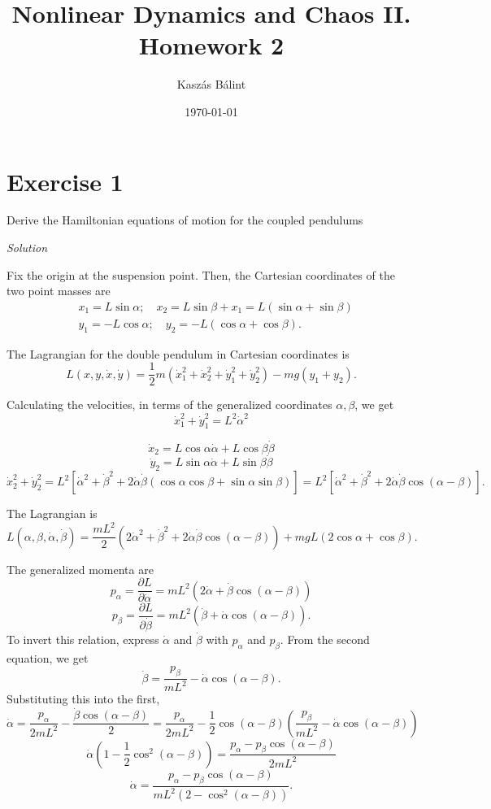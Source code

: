 \documentclass[a4paper,11pt,pdftex]{article}
\title{Nonlinear Dynamics and Chaos II. \\ Homework 2}
\author{Kaszás Bálint}
\date{\today}
\begin{document}
\pagestyle{fancy}

\maketitle


\section*{Exercise 1}
Derive the Hamiltonian equations of motion for  the coupled pendulums

\emph{Solution}

Fix the origin at the suspension point. Then, the Cartesian coordinates of the two point masses are
\begin{align*}
    &x_1 = L \sin \alpha ; \quad x_2 = L \sin \beta + x_1 = L(\sin \alpha + \sin \beta) \\
    &y_1 = -L\cos \alpha; \quad y_2 = -L(\cos \alpha + \cos \beta).
\end{align*}

The Lagrangian for the double pendulum in Cartesian coordinates is 
$$
L (x, y, \dot{x}, \dot{y}) = \frac{1}{2}m (\dot{x}^2_1+ \dot{x}^2_2 + \dot{y}^2_1 + \dot{y}^2_2) - mg(y_1 + y_2).
$$

Calculating the velocities, in terms of the generalized coordinates $\alpha, \beta$, we get
$$
\dot{x}_1^2 + \dot{y}^2_1 = L^2 \dot{\alpha}^2
$$

$$
\dot{x}_2 = L\cos \alpha \dot{\alpha} + L \cos \beta \dot{\beta}
$$
$$
\dot{y}_2 = L\sin \alpha \dot{\alpha} + L \sin \beta \dot{\beta}
$$
$$
\dot{x}^2_2 + \dot{y}^2_2 = L^2[\dot{\alpha}^2 + \dot{\beta}^2 + 2\dot{\alpha}\dot{\beta}(\cos \alpha \cos \beta + \sin \alpha \sin \beta)] = L^2[\dot{\alpha}^2 + \dot{\beta}^2 + 2\dot{\alpha}\dot{\beta}\cos(\alpha - \beta)].
$$

The Lagrangian is
$$
L(\alpha, \beta, \dot{\alpha}, \dot{\beta}) = \frac{mL^2}{2}(2\dot{\alpha}^2 + \dot{\beta}^2 + 2\dot{\alpha}\dot{\beta}\cos(\alpha - \beta)) + mgL(2\cos \alpha + \cos \beta ).
$$

The generalized momenta are
$$
p_\alpha = \frac{\partial L}{\partial \dot{\alpha}} = mL^2(2\dot{\alpha} + \dot{\beta}\cos(\alpha - \beta))
$$
$$
p_\beta = \frac{\partial L}{\partial \dot{\beta}} = mL^2(\dot{\beta} + \dot{\alpha}\cos(\alpha - \beta)).
$$
To invert this relation, express $\dot{\alpha}$ and $\dot{\beta}$ with $p_\alpha$ and $p_{\beta}$.
From the second equation, we get
$$
\dot{\beta} = \frac{p_\beta}{mL^2} - \dot{\alpha}\cos(\alpha - \beta). 
$$
Substituting this into the first,
$$
\dot{\alpha} = \frac{p_\alpha}{2mL^2} - \frac{\dot{\beta} \cos(\alpha - \beta) }{2} = \frac{p_\alpha}{2mL^2} - \frac{1}{2}\cos(\alpha-\beta)\left(\frac{p_\beta}{mL^2} - \dot{\alpha}\cos(\alpha - \beta)\right) 
$$
$$
\dot{\alpha}\left(1 - \frac{1}{2}\cos^2(\alpha - \beta)\right)= \frac{p_\alpha- p_\beta \cos(\alpha-\beta)}{2mL^2} 
$$
$$
\dot{\alpha} = \frac{p_\alpha- p_\beta \cos(\alpha-\beta)}{mL^2(2-\cos^2(\alpha - \beta))}.
$$
\end{document}
